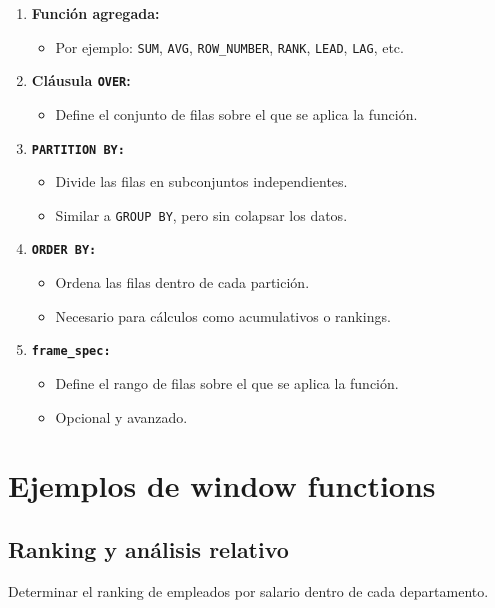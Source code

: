 \begin{enumerate}
    \item \textbf{Función agregada:}
    \begin{itemize}
        \item Por ejemplo: \texttt{SUM}, \texttt{AVG}, \texttt{ROW\_NUMBER}, \texttt{RANK}, \texttt{LEAD}, \texttt{LAG}, etc.
    \end{itemize}
    \item \textbf{Cláusula \texttt{OVER}:}
    \begin{itemize}
        \item Define el conjunto de filas sobre el que se aplica la función.
    \end{itemize}
    \item \textbf{\texttt{PARTITION BY:}}
    \begin{itemize}
        \item Divide las filas en subconjuntos independientes.
        \item Similar a \texttt{GROUP BY}, pero sin colapsar los datos.
    \end{itemize}
    \item \textbf{\texttt{ORDER BY:}}
    \begin{itemize}
        \item Ordena las filas dentro de cada partición.
        \item Necesario para cálculos como acumulativos o rankings.
    \end{itemize}
    \item \textbf{\texttt{frame\_spec:}}
    \begin{itemize}
        \item Define el rango de filas sobre el que se aplica la función.
        \item Opcional y avanzado.
    \end{itemize}
\end{enumerate}

\section{Ejemplos de window functions}

\subsection{Ranking y análisis relativo}

Determinar el ranking de empleados por salario dentro de cada
departamento.

